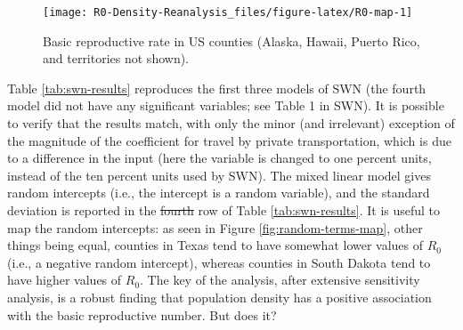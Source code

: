 \documentclass[]{elsarticle} %
\providecommand{\DIFaddtex}[1]{{\protect\color{blue}\uwave{#1}}} %
\providecommand{\DIFdeltex}[1]{{\protect\color{red}\sout{#1}}}                      %
\providecommand{\DIFaddbegin}{} %
\providecommand{\DIFaddend}{} %
\providecommand{\DIFdelbegin}{} %
\providecommand{\DIFdelend}{} %
\providecommand{\DIFadd}[1]{\texorpdfstring{\DIFaddtex{#1}}{#1}} %
\providecommand{\DIFdel}[1]{\texorpdfstring{\DIFdeltex{#1}}{}} %
\newcommand{\DIFscaledelfig}{0.5}
\newlength{\DIFdelgraphicswidth} %
\newlength{\DIFdelgraphicsheight} %
\newcommand{\DIFaddincludegraphics}[2][]{{\color{blue}\fbox{\DIFOincludegraphics[#1]{#2}}}} %
\newcommand{\DIFdelincludegraphics}[2][]{%
\sbox{\DIFdelgraphicsbox}{\DIFOincludegraphics[#1]{#2}}%
\settoboxwidth{\DIFdelgraphicswidth}{\DIFdelgraphicsbox} %
\settoboxtotalheight{\DIFdelgraphicsheight}{\DIFdelgraphicsbox} %
\scalebox{\DIFscaledelfig}{%
\parbox[b]{\DIFdelgraphicswidth}{\usebox{\DIFdelgraphicsbox}\\[-\baselineskip] \rule{\DIFdelgraphicswidth}{0em}}\llap{\resizebox{\DIFdelgraphicswidth}{\DIFdelgraphicsheight}{%
\setlength{\unitlength}{\DIFdelgraphicswidth}%
\begin{picture}(1,1)%
\thicklines\linethickness{2pt} %
{\color[rgb]{1,0,0}\put(0,0){\framebox(1,1){}}}%
{\color[rgb]{1,0,0}\put(0,0){\line( 1,1){1}}}%
{\color[rgb]{1,0,0}\put(0,1){\line(1,-1){1}}}%
\end{picture}%
}\hspace*{3pt}}} %
} %
\DeclareRobustCommand{\DIFaddbegin}{\DIFOaddbegin \let\includegraphics\DIFaddincludegraphics} %
\DeclareRobustCommand{\DIFaddend}{\DIFOaddend \let\includegraphics\DIFOincludegraphics} %
\DeclareRobustCommand{\DIFdelbegin}{\DIFOdelbegin \let\includegraphics\DIFdelincludegraphics} %
\DeclareRobustCommand{\DIFdelend}{\DIFOaddend \let\includegraphics\DIFOincludegraphics} %
\begin{document}
\begin{figure}
\texttt{[image: R0-Density-Reanalysis\_files/figure-latex/R0-map-1]} \caption{\label{fig:R0-map}Basic reproductive rate in US counties (Alaska, Hawaii, Puerto Rico, and territories not shown).}\label{fig:R0-map}
\end{figure}

Table \ref{tab:swn-results} reproduces the first three models of SWN
(the fourth model did not have any significant variables; see Table 1 in
SWN). It is possible to verify that the results match, with only the
minor (and irrelevant) exception of the magnitude of the coefficient for
travel by private transportation, which is due to a difference in the
input (here the variable is changed to one percent units, instead of the
ten percent units used by SWN). The mixed linear model gives random
intercepts (i.e., the intercept is a random variable), and the standard
deviation is reported in the \DIFdelbegin \DIFdel{fourth }\DIFdelend \DIFaddbegin \DIFadd{fifth }\DIFaddend row of Table \ref{tab:swn-results}.
It is useful to map the random intercepts: as seen in Figure
\ref{fig:random-terms-map}, other things being equal, counties in Texas
tend to have somewhat lower values of \(R_0\) (i.e., a negative random
intercept), whereas counties in South Dakota tend to have higher values
of \(R_0\). The key of the analysis, after extensive sensitivity
analysis, is a robust finding that population density has a positive
association with the basic reproductive number. But does it?

\begin{table}

\caption{\label{tab:tabulate-swn-results}\label{tab:swn-results}Reproducing SWN: Models 1-3}
\centering
{}
\end{table}
\end{document}
